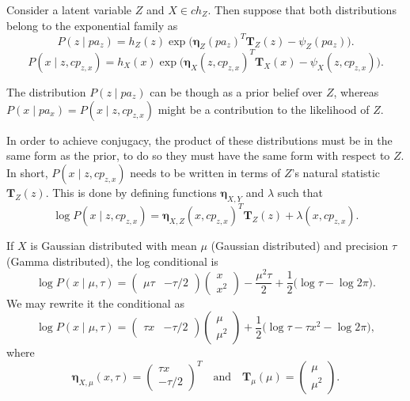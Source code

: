 Consider a latent variable \( Z \) and \( X \in ch_{Z} \). Then suppose that both distributions belong to the exponential family as
\[
  P(z \mid pa_z) = h_Z(z)\exp \Big( {\bm{\eta}_Z(pa_z)}^T\bm{T}_Z(z) - \psi_Z(pa_z) \Big).
\]
\[
  P(x \mid z,cp_{z,x}) = h_X(x)\exp \Big( {\bm{\eta}_X(z, cp_{z,x})}^T\bm{T}_X(x) - \psi_X(z, cp_{z,x}) \Big).
\]

The distribution \( P(z \mid pa_z) \) can be though as a prior belief over \( Z \), whereas \( P(x \mid pa_x) = P(x \mid z, cp_{z,x})\) might be a contribution to the likelihood of \( Z \).

In order to achieve conjugacy, the product of these distributions must be in the same form as the prior, to do so they must have the same form with respect to \( Z \). In short, \(P(x \mid z, cp_{z,x})\) needs to be written in terms of \(Z\)'s natural statistic \( \bm{T}_Z (z)\). This is done by defining functions \( \bm{\eta}_{X,Y} \) and \( \lambda \) such that \begin{equation}\label{eq:vmp_conj}
  \log P(x \mid z , cp_{z,x}) = \bm{\eta}_{X,Z}{(x, cp_{z,x})}^T \bm{T}_Z(z) + \lambda(x, cp_{z,x}).
\end{equation}

\begin{exampleth}
    If \( X \) is Gaussian distributed with mean \( \mu \) (Gaussian distributed) and precision \(\tau\) (Gamma distributed), the log conditional is
    \[
         \log P(x \mid \mu, \tau) =
         \begin{pmatrix}
             \mu \tau & -\tau/2
         \end{pmatrix}
         \begin{pmatrix}
             x\\
             x^2
         \end{pmatrix}
         - \frac{\mu^{2}\tau}{2} + \frac{1}{2}\big( \log \tau - \log 2\pi \big).
    \]
    We may rewrite it the conditional as
    \[
         \log  P(x \mid \mu, \tau) =
         \begin{pmatrix}
             \tau x & -\tau/2
         \end{pmatrix}
         \begin{pmatrix}
             \mu\\
             \mu^2
         \end{pmatrix}
         + \frac{1}{2}\big( \log \tau - \tau x^2 - \log 2\pi \big),
    \]
    where
    \[
         \bm{\eta}_{X,\mu}(x,\tau) =  \begin{pmatrix}
            \tau x\\
            -\tau/2
        \end{pmatrix}^T\quad \text{and} \quad \bm{T}_\mu(\mu)=  \begin{pmatrix}
            \mu\\
            \mu^2
        \end{pmatrix}.
    \]
\end{exampleth}

